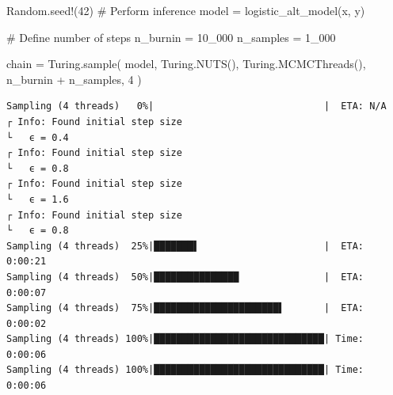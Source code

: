 \documentclass[
]{scrartcl}
\newenvironment{Shaded}{\begin{snugshade}}{\end{snugshade}}
\newcommand{\BuiltInTok}[1]{\textcolor[rgb]{0.00,0.23,0.31}{#1}}
\newcommand{\CommentTok}[1]{\textcolor[rgb]{0.37,0.37,0.37}{#1}}
\newcommand{\FloatTok}[1]{\textcolor[rgb]{0.68,0.00,0.00}{#1}}
\newcommand{\FunctionTok}[1]{\textcolor[rgb]{0.28,0.35,0.67}{#1}}
\newcommand{\NormalTok}[1]{\textcolor[rgb]{0.00,0.23,0.31}{#1}}
\newcommand{\OperatorTok}[1]{\textcolor[rgb]{0.37,0.37,0.37}{#1}}
\begin{document}
\begin{Shaded}
\begin{Highlighting}[]
\BuiltInTok{Random}\NormalTok{.}\FunctionTok{seed!}\NormalTok{(}\FloatTok{42}\NormalTok{)}
\CommentTok{\# Perform inference}
\NormalTok{model }\OperatorTok{=} \FunctionTok{logistic\_alt\_model}\NormalTok{(x, y)}

\CommentTok{\# Define number of steps}
\NormalTok{n\_burnin }\OperatorTok{=} \FloatTok{10\_000}
\NormalTok{n\_samples }\OperatorTok{=} \FloatTok{1\_000}

\NormalTok{chain }\OperatorTok{=}\NormalTok{ Turing.}\FunctionTok{sample}\NormalTok{(}
\NormalTok{    model, Turing.}\FunctionTok{NUTS}\NormalTok{(), Turing.}\FunctionTok{MCMCThreads}\NormalTok{(), n\_burnin }\OperatorTok{+}\NormalTok{ n\_samples, }\FloatTok{4}
\NormalTok{)}
\end{Highlighting}
\end{Shaded}

\begin{verbatim}
Sampling (4 threads)   0%|                              |  ETA: N/A
┌ Info: Found initial step size
└   ϵ = 0.4
┌ Info: Found initial step size
└   ϵ = 0.8
┌ Info: Found initial step size
└   ϵ = 1.6
┌ Info: Found initial step size
└   ϵ = 0.8
Sampling (4 threads)  25%|███████▌                      |  ETA: 0:00:21
Sampling (4 threads)  50%|███████████████               |  ETA: 0:00:07
Sampling (4 threads)  75%|██████████████████████▌       |  ETA: 0:00:02
Sampling (4 threads) 100%|██████████████████████████████| Time: 0:00:06
Sampling (4 threads) 100%|██████████████████████████████| Time: 0:00:06
\end{verbatim}
\end{document}
